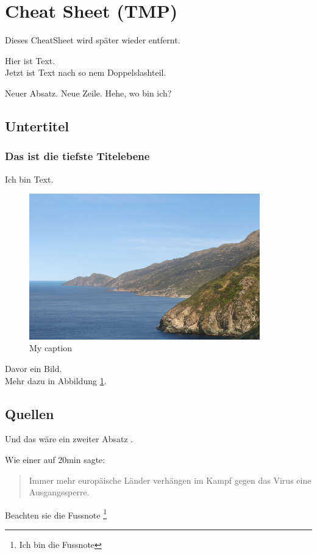\section{Cheat Sheet (TMP)}
Dieses CheatSheet wird später wieder entfernt.

Hier ist Text. \\

Jetzt ist Text nach so nem Doppelslashteil.

Neuer Absatz. \linebreak
Neue Zeile. \bigskip
Hehe, wo bin ich?

\subsection{Untertitel}
\subsubsection{Das ist die tiefste Titelebene}
Ich bin Text. 
\begin{figure}[H]
    \centering
    \includegraphics[width=100mm]{images/musterBild.png}
    \caption{My caption}
    \label{fig:bsp}
\end{figure}
Davor ein Bild. \\
Mehr dazu in Abbildung \ref{fig:bsp}.

\subsection{Quellen}
Und das wäre ein zweiter Absatz \cite{good}.

Wie einer auf 20min sagte:\cite{20min}
\begin{quote}
Immer mehr europäische Länder verhängen im Kampf gegen das Virus eine Ausgangssperre. 
\end{quote}

Beachten sie die Fussnote \footnote{Ich bin die Fussnote}

